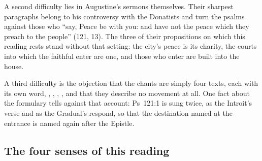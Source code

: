 A second difficulty lies in Augustine's sermons themselves. Their sharpest
paragraphs belong to his controversy with the Donatists and turn the psalms
against those who ``say, Peace be with you: and have not the
peace which they preach to the people'' (121, 13). The three of their
propositions on which this reading rests stand without that setting: the city's peace is its charity,
the courts into which the faithful enter are one, and those who enter are
built into the house.

A third difficulty is the objection that the chants are simply four texts,
each with its own word, , , ,
, and that they describe no movement at all. One fact about the formulary tells
against that account: Ps~121:1 is sung twice, as the Introit's verse and as the
Gradual's respond, so that the destination named at the entrance is named again
after the Epistle.

\subsection{The four senses of this reading}


